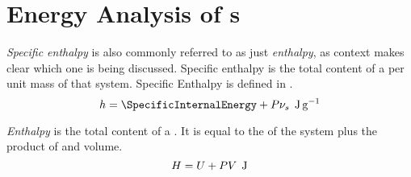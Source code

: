 \section{Energy Analysis of s}\label{def:Energy_Analysis_Closed_Systems}

\begin{definition}\label{def:Specific_Enthalpy}
  \emph{Specific enthalpy} is also commonly referred to as just \emph{enthalpy}, as context makes clear which one is being discussed.
  Specific enthalpy is the total  content of a  per unit mass of that system.
  Specific Enthalpy is defined in .
  \begin{equation}\label{eq:Specific_Enthalpy}
    \SpecificEnthalpy = \SpecificInternalEnergy + \Pressure \SpecificVolume \:\: \si{\joule\per\gram}
  \end{equation}
\end{definition}

\begin{definition}[Enthalpy]\label{def:Enthalpy}
  \emph{Enthalpy} is the total  content of a .
  It is equal to the  of the system plus the product of  and volume.
  \begin{equation}\label{eq:Enthalpy}
    H = U + P V \:\: \si{\joule}
  \end{equation}
\end{definition}

